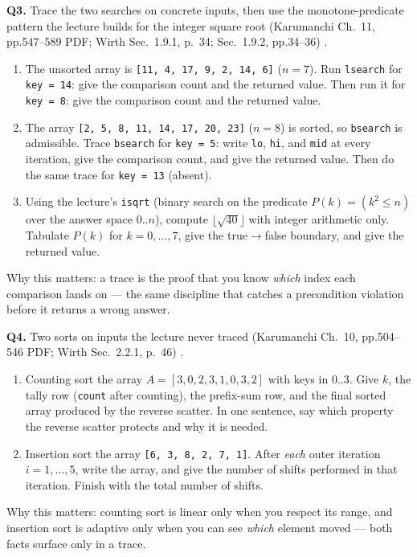 \documentclass[11pt]{article}
\begin{document}
\textbf{Q3.} Trace the two searches on concrete inputs, then use the monotone-predicate pattern the lecture builds for the integer square root (Karumanchi Ch.~11, pp.547--589 PDF; Wirth Sec.~1.9.1, p.~34; Sec.~1.9.2, pp.34--36) \cite{Karumanchi2017_data_structures_algorithms_made_easy,Wirth2004_algorithms_data_structures}.
\begin{enumerate}
  \item[(a)] The unsorted array is \texttt{[11, 4, 17, 9, 2, 14, 6]} ($n = 7$). Run \texttt{lsearch} for \texttt{key = 14}: give the comparison count and the returned value. Then run it for \texttt{key = 8}: give the comparison count and the returned value.
  \item[(b)] The array \texttt{[2, 5, 8, 11, 14, 17, 20, 23]} ($n = 8$) is sorted, so \texttt{bsearch} is admissible. Trace \texttt{bsearch} for \texttt{key = 5}: write \texttt{lo}, \texttt{hi}, and \texttt{mid} at every iteration, give the comparison count, and give the returned value. Then do the same trace for \texttt{key = 13} (absent).
  \item[(c)] Using the lecture's \texttt{isqrt} (binary search on the predicate $P(k) = (k^2 \le n)$ over the answer space $0..n$), compute $\lfloor \sqrt{40} \rfloor$ with integer arithmetic only. Tabulate $P(k)$ for $k = 0,\dots,7$, give the true$\to$false boundary, and give the returned value.
\end{enumerate}
Why this matters: a trace is the proof that you know \emph{which} index each comparison lands on --- the same discipline that catches a precondition violation before it returns a wrong answer.

\textbf{Q4.} Two sorts on inputs the lecture never traced (Karumanchi Ch.~10, pp.504--546 PDF; Wirth Sec.~2.2.1, p.~46) \cite{Karumanchi2017_data_structures_algorithms_made_easy,Wirth2004_algorithms_data_structures}.
\begin{enumerate}
  \item[(a)] Counting sort the array $A = [3, 0, 2, 3, 1, 0, 3, 2]$ with keys in $0..3$. Give $k$, the tally row (\texttt{count} after counting), the prefix-sum row, and the final sorted array produced by the reverse scatter. In one sentence, say which property the reverse scatter protects and why it is needed.
  \item[(b)] Insertion sort the array \texttt{[6, 3, 8, 2, 7, 1]}. After \emph{each} outer iteration $i = 1,\dots,5$, write the array, and give the number of shifts performed in that iteration. Finish with the total number of shifts.
\end{enumerate}
Why this matters: counting sort is linear only when you respect its range, and insertion sort is adaptive only when you can see \emph{which} element moved --- both facts surface only in a trace.
\end{document}
